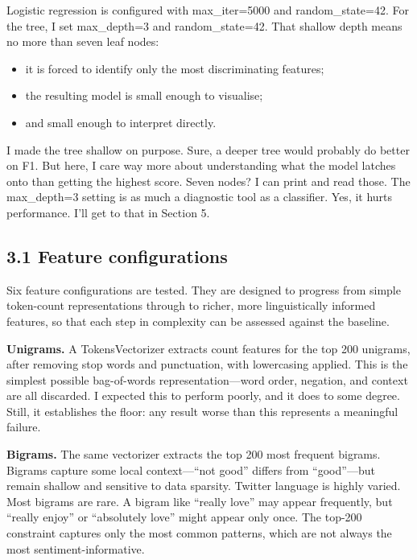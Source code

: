 \documentclass[12pt]{article}
\begin{document}
Logistic regression is configured with max\_iter=5000 and random\_state=42. For the tree, I set max\_depth=3 and random\_state=42. That shallow depth means no more than seven leaf nodes:

\begin{itemize}

  \item it is forced to identify only the most discriminating features;

  \item the resulting model is small enough to visualise;

  \item and small enough to interpret directly.

\end{itemize}

I made the tree shallow on purpose. Sure, a deeper tree would probably do better on F1. But here, I care way more about understanding what the model latches onto than getting the highest score. Seven nodes? I can print and read those. The max\_depth=3 setting is as much a diagnostic tool as a classifier. Yes, it hurts performance. I'll get to that in Section 5.



\subsection*{3.1 Feature configurations}



Six feature configurations are tested. They are designed to progress from simple token-count representations through to richer, more linguistically informed features, so that each step in complexity can be assessed against the baseline.

\textbf{Unigrams.} A TokensVectorizer extracts count features for the top 200 unigrams, after removing stop words and punctuation, with lowercasing applied. This is the simplest possible bag-of-words representation---word order, negation, and context are all discarded. I expected this to perform poorly, and it does to some degree. Still, it establishes the floor: any result worse than this represents a meaningful failure.

\textbf{Bigrams.} The same vectorizer extracts the top 200 most frequent bigrams. Bigrams capture some local context---``not good'' differs from ``good''---but remain shallow and sensitive to data sparsity. Twitter language is highly varied. Most bigrams are rare. A bigram like ``really love'' may appear frequently, but ``really enjoy'' or ``absolutely love'' might appear only once. The top-200 constraint captures only the most common patterns, which are not always the most sentiment-informative.
\end{document}
